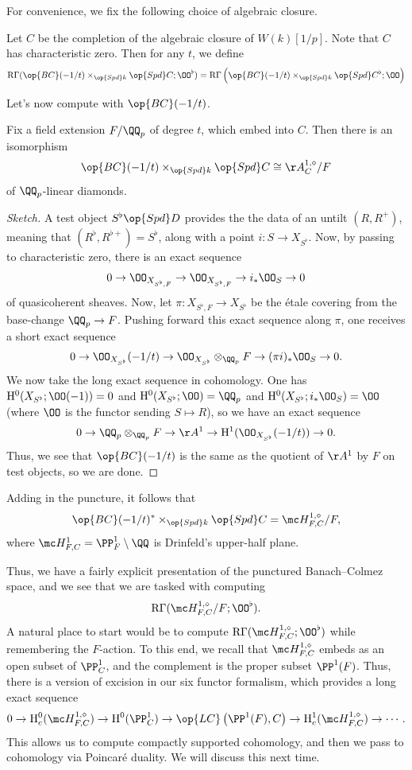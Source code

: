 \documentclass[../notes.tex]{subfiles}
\begin{document}
For convenience, we fix the following choice of algebraic closure.
\begin{notation}
	Let $C$ be the completion of the algebraic closure of $W(k)[1/p]$. Note that $C$ has characteristic zero. Then for any $t$, we define
	\[\mathrm R\Gamma(\op{BC}(-1/t)\times_{\op{Spd}k}\op{Spd}C;\OO^\flat)=\mathrm R\Gamma\left(\op{BC}(-1/t)\times_{\op{Spd}k}\op{Spd}C^\flat;\OO\right)\]
\end{notation}
Let's now compute with $\op{BC}(-1/t)$.
\begin{proposition}
	Fix a field extension $F/\QQ_p$ of degree $t$, which embed into $C$. Then there is an isomorphism
	\[\op{BC}(-1/t)\times_{\op{Spd}k}\op{Spd}C\cong\AA^{1,\diamond}_C/F\]
	of $\QQ_p$-linear diamonds.
\end{proposition}
\begin{proof}[Sketch]
	A test object $S^\flat\op{Spd}D$ provides the the data of an untilt $(R,R^+)$, meaning that $(R^\flat,R^{\flat+})=S^\flat$, along with a point $i\colon S\to X_{S^\flat}$. Now, by passing to characteristic zero, there is an exact sequence
	\[0\to\OO_{X_{S^\flat,F}}\to\OO_{X_{S^\flat,F}}\to i_*\OO_S\to0\]
	of quasicoherent sheaves. Now, let $\pi\colon X_{S^\flat,F}\to X_{S^\flat}$ be the \'etale covering from the base-change $\QQ_p\to F$. Pushing forward this exact sequence along $\pi$, one receives a short exact sequence
	\[0\to\OO_{X_{S^\flat}}(-1/t)\to\OO_{X_{S^\flat}}\otimes_{\QQ_p}F\to(\pi i)_*\OO_S\to0.\]
	We now take the long exact sequence in cohomology. One has $\mathrm H^0(X_{S^\flat};\OO(-1))=0$ and $\mathrm H^0(X_{S^\flat};\OO)=\QQ_p$ and $\mathrm H^0(X_{S^\flat};i_*\OO_S)=\OO$ (where $\OO$ is the functor sending $S\mapsto R$), so we have an exact sequence
	\[0\to \QQ_p\otimes_{\QQ_p}F\to\AA^1\to\mathrm H^1(\OO_{X_{S^\flat}}(-1/t))\to0.\]
	Thus, we see that $\op{BC}(-1/t)$ is the same as the quotient of $\AA^1$ by $F$ on test objects, so we are done.
\end{proof}
\begin{remark}
	Adding in the puncture, it follows that
	\[\op{BC}(-1/t)^*\times_{\op{Spd}k}\op{Spd}C=\mc H^{1,\diamond}_{F,C}/F,\]
	where $\mc H^1_{F,C}=\PP^1_F\setminus\QQ$ is Drinfeld's upper-half plane.
\end{remark}
Thus, we have a fairly explicit presentation of the punctured Banach--Colmez space, and we see that we are tasked with computing
\[\mathrm R\Gamma(\mc H^{1,\diamond}_{F,C}/F;\OO^\flat).\]
A natural place to start would be to compute $\mathrm R\Gamma(\mc H^{1,\diamond}_{F,C};\OO^\flat)$ while remembering the $F$-action. To this end, we recall that $\mc H^{1,\diamond}_{F,C}$ embeds as an open subset of $\PP^1_C$, and the complement is the proper subset $\PP^1(F)$. Thus, there is a version of excision in our six functor formalism, which provides a long exact sequence
\[0\to\mathrm H^0_c(\mc H^{1,\diamond}_{F,C})\to\mathrm H^0(\PP^1_C)\to\op{LC}\left(\PP^1(F),C\right)\to\mathrm H^1_c(\mc H^{1,\diamond}_{F,C})\to\cdots.\]
This allows us to compute compactly supported cohomology, and then we pass to cohomology via Poincar\'e duality. We will discuss this next time.
\end{document}
